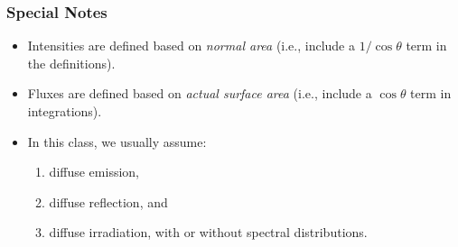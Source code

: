 \subsubsection*{Special Notes}

\begin{itemize}
  \item Intensities are defined based on \emph{normal area} 
    (i.e., include a $1/\cos\theta$ term in the definitions).
  \item Fluxes are defined based on \emph{actual surface area} 
    (i.e., include a $\cos\theta$ term in integrations).
  \item In this class, we usually assume:
    \begin{enumerate}[label=\roman*)]
      \item diffuse emission,
      \item diffuse reflection, and
      \item diffuse irradiation, with or without spectral distributions.
    \end{enumerate}
\end{itemize}









